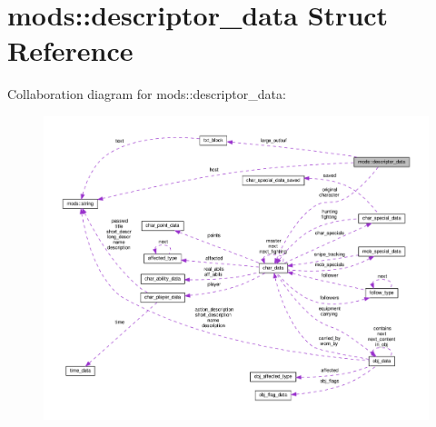 \hypertarget{structmods_1_1descriptor__data}{}\section{mods\+:\+:descriptor\+\_\+data Struct Reference}
\label{structmods_1_1descriptor__data}


Collaboration diagram for mods\+:\+:descriptor\+\_\+data\+:
\nopagebreak
\begin{figure}[H]
\begin{center}
\leavevmode
\includegraphics[width=350pt]{structmods_1_1descriptor__data__coll__graph}
\end{center}
\end{figure}
